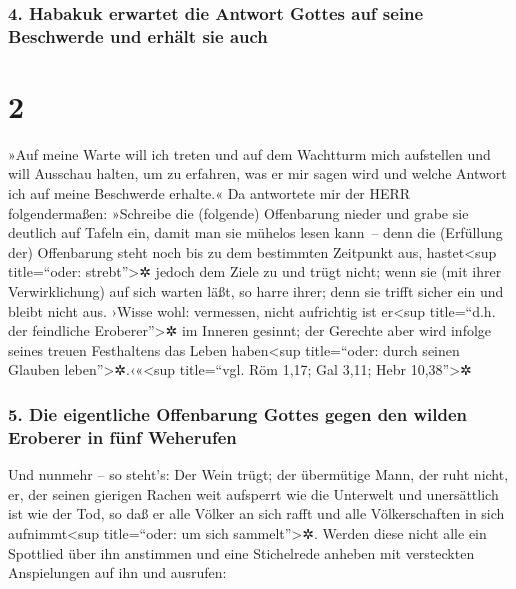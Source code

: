 \hypertarget{habakuk-erwartet-die-antwort-gottes-auf-seine-beschwerde-und-erhuxe4lt-sie-auch}{%
\subsubsection{4. Habakuk erwartet die Antwort Gottes auf seine
Beschwerde und erhält sie
auch}\label{habakuk-erwartet-die-antwort-gottes-auf-seine-beschwerde-und-erhuxe4lt-sie-auch}}

\hypertarget{section-1}{%
\section{2}\label{section-1}}

 »Auf meine Warte will ich treten und auf dem Wachtturm
mich aufstellen und will Ausschau halten, um zu erfahren, was er mir
sagen wird und welche Antwort ich auf meine Beschwerde erhalte.«
 Da antwortete mir der HERR folgendermaßen: »Schreibe die
(folgende) Offenbarung nieder und grabe sie deutlich auf Tafeln ein,
damit man sie mühelos lesen kann~--  denn die (Erfüllung
der) Offenbarung steht noch bis zu dem bestimmten Zeitpunkt aus,
hastet\textless sup title=``oder: strebt''\textgreater✲ jedoch dem Ziele
zu und trügt nicht; wenn sie (mit ihrer Verwirklichung) auf sich warten
läßt, so harre ihrer; denn sie trifft sicher ein und bleibt nicht aus.
 ›Wisse wohl: vermessen, nicht aufrichtig ist
er\textless sup title=``d.h. der feindliche Eroberer''\textgreater✲ im
Inneren gesinnt; der Gerechte aber wird infolge seines treuen
Festhaltens das Leben haben\textless sup title=``oder: durch seinen
Glauben leben''\textgreater✲.‹«\textless sup title=``vgl. Röm 1,17; Gal
3,11; Hebr 10,38''\textgreater✲

\hypertarget{die-eigentliche-offenbarung-gottes-gegen-den-wilden-eroberer-in-fuxfcnf-weherufen}{%
\subsubsection{5. Die eigentliche Offenbarung Gottes gegen den wilden
Eroberer in fünf
Weherufen}\label{die-eigentliche-offenbarung-gottes-gegen-den-wilden-eroberer-in-fuxfcnf-weherufen}}

 Und nunmehr -- so steht's: Der Wein trügt; der übermütige
Mann, der ruht nicht, er, der seinen gierigen Rachen weit aufsperrt wie
die Unterwelt und unersättlich ist wie der Tod, so daß er alle Völker an
sich rafft und alle Völkerschaften in sich aufnimmt\textless sup
title=``oder: um sich sammelt''\textgreater✲.  Werden
diese nicht alle ein Spottlied über ihn anstimmen und eine Stichelrede
anheben mit versteckten Anspielungen auf ihn und ausrufen:

